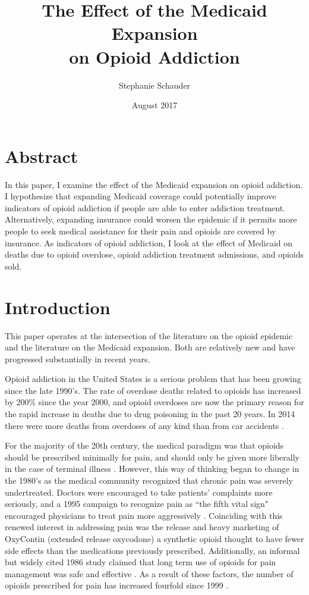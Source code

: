 \documentclass[11pt]{article}
\title{The Effect of the Medicaid Expansion \\ on Opioid Addiction}
\author{Stephanie Schauder}
\date{August 2017}
\begin{document}
\maketitle



\section{Abstract}

In this paper, I examine the effect of the Medicaid expansion on opioid addiction.  I hypothesize that expanding Medicaid coverage could potentially improve indicators of opioid addiction if people are able to enter addiction treatment.  Alternatively, expanding insurance could worsen the epidemic if it permits more people to seek medical assistance for their pain and opioids are covered by insurance.  As indicators of opioid addiction, I look at the effect of Medicaid on deaths due to opioid overdose, opioid addiction treatment admissions, and opioids sold.

\section{Introduction} 


This paper operates at the intersection of the literature on the opioid epidemic and the literature on the Medicaid expansion.  Both are relatively new and have progressed substantially in recent years.  

Opioid addiction in the United States is a serious problem that has been growing since the late 1990's.  The rate of overdose deaths related to opioids has increased by 200$\%$ since the year 2000, and opioid overdoses are now the primary reason for the rapid increase in deaths due to drug poisoning in the past 20 years.  In 2014 there were more deaths from overdoses of any kind than from car accidents \citep{Rudd2016}.   

For the majority of the 20th century, the medical paradigm was that opioids should be prescribed minimally for pain, and should only be given more liberally in the case of terminal illness \citep{Meldrum2016}.  However, this way of thinking began to change in the 1980's as the medical community recognized that chronic pain was severely undertreated.  Doctors were encouraged to take patients' complaints more seriously, and a 1995 campaign to recognize pain as ``the fifth vital sign" encouraged physicians to treat pain more aggressively \citep{Kolodny2015}.  Coinciding with this renewed interest in addressing pain was the release and heavy marketing of OxyContin (extended release oxycodone) a synthetic opioid thought to have fewer side effects than the medications previously prescribed. Additionally, an informal but widely cited 1986 study claimed that long term use of opioids for pain management was safe and effective \citep{Kolodny2015, Portenoy1986}.  As a result of these factors, the number of opioids prescribed for pain has increased fourfold since 1999 \citep{CentersforDiseaseControlandPrevention}.  
\end{document}
